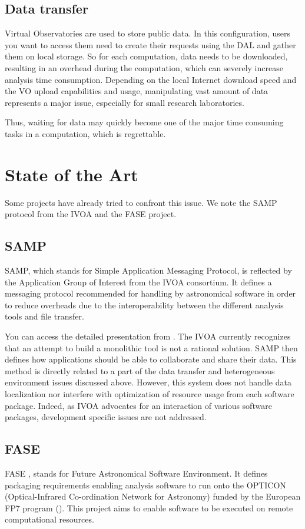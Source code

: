 		\subsection{Data transfer}
			Virtual Observatories are used to store public data. In this configuration, users you want to access them need to create their requests using the DAL and gather them on local storage.
			So for each computation, data needs to be downloaded, resulting in an overhead during the computation, which can severely increase analysis time consumption.
			Depending on the local Internet download speed and the VO upload capabilities and usage, manipulating vast amount of data represents a major issue, especially for small research laboratories.
			
			Thus, waiting for data may quickly become one of the major time consuming tasks in a computation, which is regrettable.

	\section{State of the Art}
		Some projects have already tried to confront this issue. We note the SAMP protocol from the IVOA and the FASE project.
		
		\subsection{SAMP}
			SAMP, which stands for Simple Application Messaging Protocol, is reflected by the Application Group of Interest from the IVOA consortium.
			It defines a messaging protocol recommended for handling by astronomical software in order to reduce overheads due to the interoperability between the different analysis tools and file transfer.
			
			You can access the detailed presentation from \cite{Taylor}. The IVOA currently recognizes that an attempt to build a monolithic tool is not a rational solution. SAMP then defines how applications should be able to collaborate and share their data.
			This method is directly related to a part of the data transfer and heterogeneous environment issues discussed above.
			However, this system does not handle data localization nor interfere with optimization of resource usage from each software package.
			Indeed, as IVOA advocates for an interaction of various software packages, development specific issues are not addressed. 
			
		\subsection{FASE}
			FASE \citep{Granet}, stands for Future Astronomical Software Environment.
			It defines packaging requirements enabling analysis software to run onto the OPTICON (Optical-Infrared Co-ordination Network for Astronomy) funded by the European FP7 program (\cite{Fase}).
			This project aims to enable software to be executed on remote computational resources.
			
